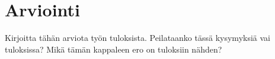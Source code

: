 \chapter{Arviointi}
\label{ch:arviointi}
Kirjoitta tähän arviota työn tuloksista. Peilataanko tässä kysymyksiä vai tuloksissa? Mikä tämän kappaleen ero on tuloksiin nähden?